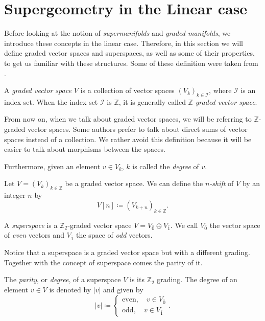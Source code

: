 \section{Supergeometry in the Linear case}
\label{sec:Linear_case}

Before looking at the notion of \emph{supermanifolds} and \emph{graded manifolds}, we introduce these concepts in the linear case.
Therefore, in this section we will define graded vector spaces and superspaces, as well as some of their properties, to get us familiar with these structures.
Some of these definition were taken from \cite{Binda}.

\begin{definition}
    A \emph{graded vector space $V$} is a collection of vector spaces $(V_k)_{k \in \mathcal{I}}$, where $\mathcal{I}$ is an index set.
    When the index set $\mathcal{I}$ is $\mathbb{Z}$, it is generally called \emph{$\mathbb{Z}$-graded vector space}.
\end{definition}

From now on, when we talk about graded vector spaces, we will be referring to $\mathbb{Z}$-graded vector spaces.
Some authors prefer to talk about direct sums of vector spaces instead of a collection.
We rather avoid this definition because it will be easier to talk about morphisms between the spaces.

Furthermore, given an element $v \in V_k$, $k$ is called the \emph{degree} of $v$.

\begin{definition}
    Let $V = (V_k)_{k \in \mathbb{Z}}$ be a graded vector space.
    We can define the \emph{$n$-shift} of $V$ by an integer $n$ by
    \begin{equation*}
        V[n] \coloneqq (V_{k + n})_{k \in \mathbb{Z}} .
    \end{equation*}
\end{definition}

\begin{definition}
    A \emph{superspace} is a $\mathbb{Z}_2$-graded vector space $V = V_{\bar{0}} \oplus V_{\bar{1}}$.
    We call $V_{\bar{0}}$ the vector space of \emph{even} vectors and $V_{\bar{1}}$ the space of \emph{odd} vectors.
\end{definition}

Notice that a superspace is a graded vector space but with a different grading.
Together with the concept of superspace comes the parity of it.

\begin{definition}
    The \emph{parity}, or \emph{degree}, of a superspace $V$ is its $\mathbb{Z}_2$ grading.
    The degree of an element $v \in V$ is denoted by $|v|$ and given by
    \begin{equation*}
        |v| \coloneqq
        \begin{cases}
            \text{even}, \quad v \in V_{\bar{0}} \\
            \text{odd}, \quad v \in V_{\bar{1}}
        \end{cases}.
    \end{equation*}
\end{definition}

